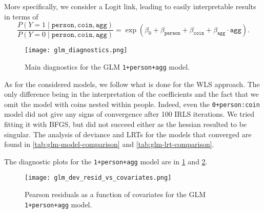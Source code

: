 \documentclass[a4paper, 12pt,oneside]{article}
\begin{document}
			More specifically, we consider a Logit link, leading to easily interpretable results in terms of 
			\begin{equation}
				\label{eq:glm_model}
				\frac{P(Y=1\mid \texttt{person},\texttt{coin},\texttt{agg})}{P(Y=0\mid \texttt{person},\texttt{coin},\texttt{agg})} = 
				\exp(\beta_0 + \beta_{\texttt{person}}+\beta_{\texttt{coin}} +\beta_{\texttt{agg}}\cdot\texttt{agg}).
			\end{equation}
			\begin{figure}[h!]
				\centering
				\texttt{[image: glm\_diagnostics.png]}
				\caption{Main diagnostics for the GLM \texttt{1+person+agg} model.}
				\label{fig:glm-diagnostic}
			\end{figure}

			As for the considered models, we follow what is done for the WLS approach. The only difference being in the interpretation of the coefficients and the fact that we omit the model with coins nested within people. Indeed, even the \texttt{0+person:coin} model did not give any signs of convergence after 100 IRLS iterations. We tried fitting it with BFGS, but did not succeed either as the hessian resulted to be singular. The analysis of deviance and LRTs for the models that converged are found in \ref{tab:glm-model-comparison} and \ref{tab:glm-lrt-comparison}.

			The diagnostic plots for the \texttt{1+person+agg} model are in \ref{fig:glm-diagnostic} and \ref{fig:dev-resid-vs-covariates}. 
			\begin{figure}[htb]
				\vspace{-1em}
				\centering
				\texttt{[image: glm\_dev\_resid\_vs\_covariates.png]}
				\caption{Pearson residuals as a function of covariates for the GLM \texttt{1+person+agg} model.}
				\label{fig:dev-resid-vs-covariates}
			\end{figure}	
\end{document}
